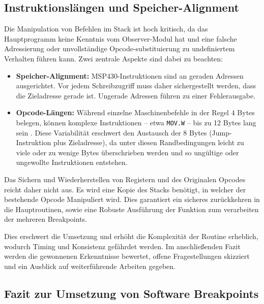 \subsection{Instruktionsl\"angen und Speicher-Alignment}
\label{sec:TechnischeUmsetzunSoftwareBreakpoints}

Die Manipulation von Befehlen im Stack ist hoch kritisch, da das Hauptprogramm keine Kenntnis vom Observer-Modul hat und eine falsche Adressierung oder unvollst\"andige Opcode-substituierung zu undefiniertem Verhalten f\"uhren kann. Zwei zentrale Aspekte sind dabei zu beachten:

\begin{itemize}
	\item \textbf{Speicher-Alignment:} MSP430-Instruktionen sind an geraden Adressen ausgerichtet. Vor jedem Schreibzugriff muss daher sichergestellt werden, dass die Zieladresse gerade ist. Ungerade Adressen f\"uhren zu einer Fehlerausgabe.
	\item \textbf{Opcode-L\"angen:} W\"ahrend einzelne Maschinenbefehle in der Regel 4 Bytes belegen, k\"onnen komplexe Instruktionen – etwa \texttt{MOV.\allowbreak W} – bis zu 12 Bytes lang sein . Diese Variabilit\"at erschwert den Austausch der 8 Bytes (Jump-Instruktion plus Zieladresse), da unter diesen Randbedingungen leicht zu viele oder zu wenige Bytes \"uberschrieben werden und so ung\"ultige oder ungewollte Instruktionen entstehen.
\end{itemize}

Das Sichern und Wiederherstellen von Registern und des Originalen Opcodes reicht daher nicht aus. Es wird eine Kopie des Stacks ben\"otigt, in welcher der bestehende Opcode Manipuliert wird. Dies garantiert ein sicheres zur\"uckkehren in die Hauptroutinen, sowie eine Robuste Ausf\"uhrung der Funktion zum verarbeiten der \ggf mehreren Breakpoints.

Dies erschwert die Umsetzung und erh\"oht die Komplexit\"at der Routine erheblich, wodurch Timing und Konsistenz gef\"ahrdet werden. Im anschlie{\ss}enden Fazit werden die gewonnenen Erkenntnisse bewertet, offene Fragestellungen skizziert und ein Ausblick auf weiterf\"uhrende Arbeiten gegeben.

\subsection{Fazit zur Umsetzung von Software Breakpoints}
\label{sec:FazitSoftwareBreakpoints}

